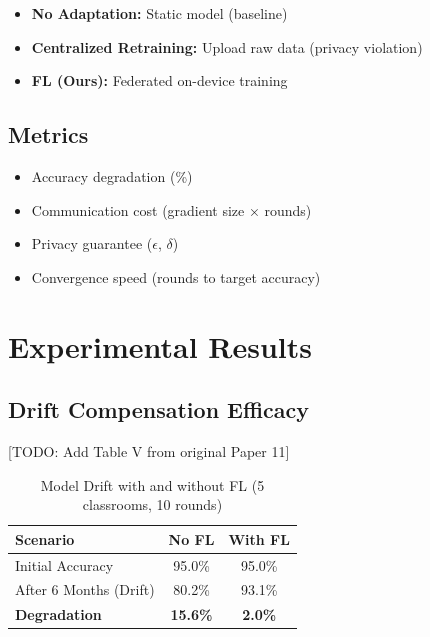 \documentclass[conference]{IEEEtran}
\begin{document}
\begin{itemize}
    \item \textbf{No Adaptation:} Static model (baseline)
    \item \textbf{Centralized Retraining:} Upload raw data (privacy violation)
    \item \textbf{FL (Ours):} Federated on-device training
\end{itemize}

\subsection{Metrics}

\begin{itemize}
    \item Accuracy degradation (\%)
    \item Communication cost (gradient size × rounds)
    \item Privacy guarantee ($\epsilon$, $\delta$)
    \item Convergence speed (rounds to target accuracy)
\end{itemize}

\section{Experimental Results}

\subsection{Drift Compensation Efficacy}

[TODO: Add Table V from original Paper 11]

\begin{table}[h]
\caption{Model Drift with and without FL (5 classrooms, 10 rounds)}
\begin{center}
\begin{tabular}{lcc}
\toprule
\textbf{Scenario} & \textbf{No FL} & \textbf{With FL} \\
\midrule
Initial Accuracy & 95.0\% & 95.0\% \\
After 6 Months (Drift) & 80.2\% & 93.1\% \\
\textbf{Degradation} & \textbf{15.6\%} & \textbf{2.0\%} \\
\bottomrule
\end{tabular}
\end{center}
\label{tab:drift}
\end{table}
\end{document}
